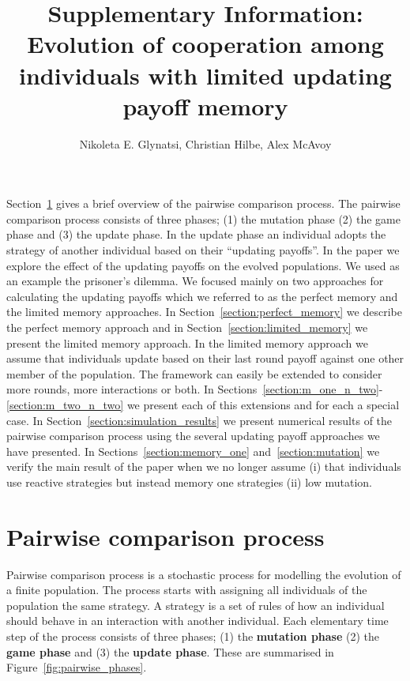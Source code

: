 \documentclass[11pt]{article}
\title{\bf  \sffamily \LARGE Supplementary Information: Evolution of cooperation among individuals with
limited updating payoff memory\\}
\date{}
\author{Nikoleta E. Glynatsi, Christian Hilbe, Alex McAvoy}
\theoremstyle{plainCl1}
\theoremstyle{plainCl2}
\begin{document}
\maketitle

Section~\ref{section:pairwise_comparison} gives a brief overview of the pairwise
comparison process. The pairwise comparison process consists of three phases;
(1) the mutation phase (2) the game phase and (3) the update phase. In the
update phase an individual adopts the strategy of another individual based on
their ``updating payoffs''. In the paper we explore the effect of the updating
payoffs on the evolved populations. We used as an example the prisoner's
dilemma. We focused mainly on two approaches for calculating the updating
payoffs which we referred to as the perfect memory and the limited memory
approaches. In Section~\ref{section:perfect_memory} we describe the perfect
memory approach and in Section~\ref{section:limited_memory} we present the
limited memory approach. In the limited memory approach we assume that
individuals update based on their last round payoff against one other member of
the population. The framework can easily be extended to consider more rounds,
more interactions or both. In
Sections~\ref{section:m_one_n_two}-\ref{section:m_two_n_two} we present each of
this extensions and for each a special case.
In Section~\ref{section:simulation_results} we present numerical results of the
pairwise comparison process using the several updating payoff approaches we have
presented. In Sections~\ref{section:memory_one} and~\ref{section:mutation} we
verify the main result of the paper when we no longer assume (i) that
individuals use reactive strategies but instead memory one strategies (ii) low
mutation.


\section{Pairwise comparison process}\label{section:pairwise_comparison}

Pairwise comparison process is a stochastic process for modelling the evolution
of a finite population. The process starts with assigning all individuals of the
population the same strategy. A strategy is a set of rules of how an individual
should behave in an interaction with another individual. Each elementary time
step of the process consists of three phases; (1) the \textbf{mutation phase}
(2) the \textbf{game phase} and (3) the \textbf{update phase}. These are summarised
in Figure~\ref{fig:pairwise_phases}.
\end{document}
